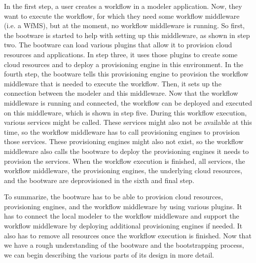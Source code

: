 In the first step, a user creates a workflow in a modeler application.
Now, they want to execute the workflow, for which they need some workflow middleware (i.e. a WfMS), but at the moment, no workflow middleware is running.
So first, the bootware is started to help with setting up this middleware, as shown in step two.
The bootware can load various plugins that allow it to provision cloud resources and applications.
In step three, it uses those plugins to create some cloud resources and to deploy a provisioning engine in this environment.
In the fourth step, the bootware tells this provisioning engine to provision the workflow middleware that is needed to execute the workflow.
Then, it sets up the connection between the modeler and this middleware.
Now that the workflow middleware is running and connected, the workflow can be deployed and executed on this middleware, which is shown in step five.
During this workflow execution, various services might be called.
These services might also not be available at this time, so the workflow middleware has to call provisioning engines to provision those services.
These provisioning engines might also not exist, so the workflow middleware also calls the bootware to deploy the provisioning engines it needs to provision the services.
When the workflow execution is finished, all services, the workflow middleware, the provisioning engines, the underlying cloud resources, and the bootware are deprovisioned in the sixth and final step.

To summarize, the bootware has to be able to provision cloud resources, provisioning engines, and the workflow middleware by using various plugins.
It has to connect the local modeler to the workflow middleware and support the workflow middleware by deploying additional provisioning engines if needed.
It also has to remove all resources once the workflow execution is finished.
Now that we have a rough understanding of the bootware and the bootstrapping process, we can begin describing the various parts of its design in more detail.













